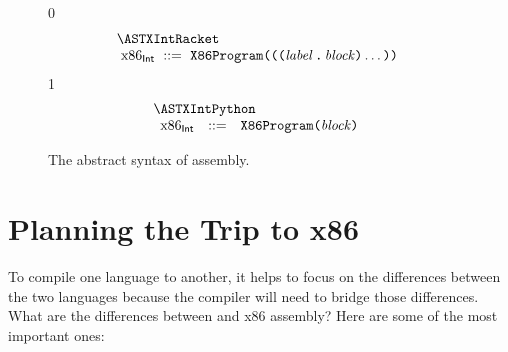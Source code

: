 \documentclass[7x10]{TimesAPriori_MIT}%
\def\racketEd{0}
\def\pythonEd{1}
\def\edition{1}
\newcommand{\pythonColor}[0]{}
\numberwithin{theorem}{chapter}
\numberwithin{definition}{chapter}
\numberwithin{equation}{chapter}
\begin{document}
\begin{figure}[tp]
\begin{tcolorbox}[colback=white]
\small
{\if\edition\racketEd
\[\arraycolsep=3pt
\begin{array}{l}
  \ASTXIntRacket \\
\begin{array}{lcl}
\LangXIntM{} &::= & \XPROGRAM{\itm{info}}{\LP\LP\itm{label} \,\key{.}\, \Block \RP\ldots\RP}
\end{array}
\end{array}
\]
\fi}
{\if\edition\pythonEd\pythonColor
\[
\begin{array}{l}
 \ASTXIntPython \\
\begin{array}{lcl}
\LangXIntM{} &::= & \XPROGRAM{}{\Block}{}
\end{array}
\end{array}
\]
\fi}
\end{tcolorbox}
\caption{The abstract syntax of \LangXInt{} assembly.}
\label{fig:x86-int-ast}
\end{figure}

\section{Planning the Trip to x86}
\label{sec:plan-s0-x86}

To compile one language to another, it helps to focus on the
differences between the two languages because the compiler will need
to bridge those differences. What are the differences between \LangVar{}
and x86 assembly? Here are some of the most important ones:
\end{document}
